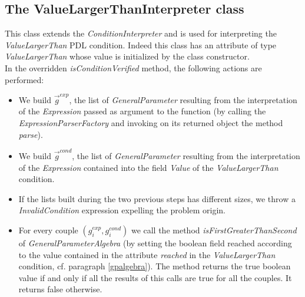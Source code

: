 \documentclass[a4paper,11pt] {ivoa}
\begin{document}
\subsection{The ValueLargerThanInterpreter class}\label{VLT}
This class extends the  {\it ConditionInterpreter} and is used for interpreting the {\it ValueLargerThan} PDL condition. Indeed this class has an attribute of type {\it ValueLargerThan} whose value is initialized by the class constructor. \\
In the overridden {\it isConditionVerified} method, the following actions are performed:
\begin{itemize}
\item We build $\vec g^{exp}$, the list of {\it GeneralParameter} resulting from the interpretation of the {\it Expression} passed as argument to the function (by calling the {\it ExpressionParserFactory} and invoking on its returned object the method {\it parse}).
\item We build $\vec g^{cond}$, the list of {\it GeneralParameter} resulting from the interpretation of the {\it Expression} contained into the field {\it Value} of the {\it ValueLargerThan} condition.
\item If the lists built during the two previous steps has different sizes, we throw a {\it InvalidCondition} expression expelling the problem origin. 
\item For every couple $(g_i^{exp}, g_i^{cond})$ we call the method  {\it isFirstGreaterThanSecond} of {\it GeneralParameterAlgebra} (by setting the boolean field reached according to the value contained in the attribute {\it reached} in the  {\it ValueLargerThan} condition, cf. paragraph \ref{gpalgebra}). The method returns the true boolean value if and only if all the results of this calls are true for all the couples. It returns false otherwise. 
\end{itemize}
\end{document}
